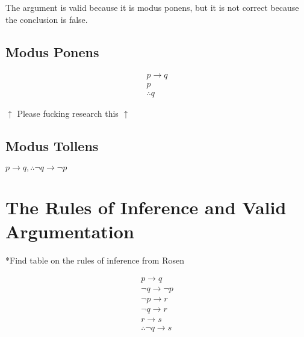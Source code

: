 \documentclass[12pt]{article}
\begin{document}
The argument is valid because it is modus ponens, but it is not correct because
the conclusion is false.

\subsection{Modus Ponens}

\begin{align*}
  p \to q \\
  p \\
  \therefore q
\end{align*}

$\uparrow$ Please fucking research this $\uparrow$

\subsection{Modus Tollens}

\center
$p \to q, \therefore \neg q \to \neg p$
\endcenter

\section{The Rules of Inference and Valid Argumentation}

*Find table on the rules of inference from Rosen

\begin{align}
  p \to q \\
  \neg q \to \neg p\\
  \neg p \to r\\
  \neg q \to r\\
  r \to s\\
  \therefore \neg q \to s
\end{align}
\end{document}
